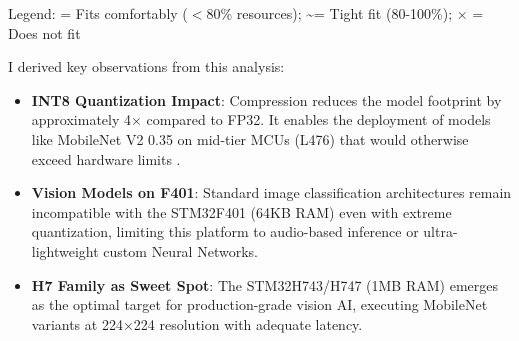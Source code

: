 \begin{table}[h!]
    \centering
    \caption{Representative Model-Board Compatibility (INT8 Quantized)}
    \label{tab:model_board_compat_summary}
    \vspace{2mm}
    \begin{flushleft}
        \small
        Legend: \checkmark = Fits comfortably ($<$80\% resources); \textasciitilde = Tight fit (80-100\%); $\times$ = Does not fit
    \end{flushleft}
\end{table}

I derived key observations from this analysis:
\begin{itemize}
    \item \textbf{INT8 Quantization Impact}: Compression reduces the model footprint by approximately 4$\times$ compared to FP32. It enables the deployment of models like MobileNet V2 0.35 on mid-tier MCUs (L476) that would otherwise exceed hardware limits \cite{st_cubeai_docs}.
    \item \textbf{Vision Models on F401}: Standard image classification architectures remain incompatible with the STM32F401 (64KB RAM) even with extreme quantization, limiting this platform to audio-based inference or ultra-lightweight custom Neural Networks.
    \item \textbf{H7 Family as Sweet Spot}: The STM32H743/H747 (1MB RAM) emerges as the optimal target for production-grade vision AI, executing MobileNet variants at 224$\times$224 resolution with adequate latency.
\end{itemize}


